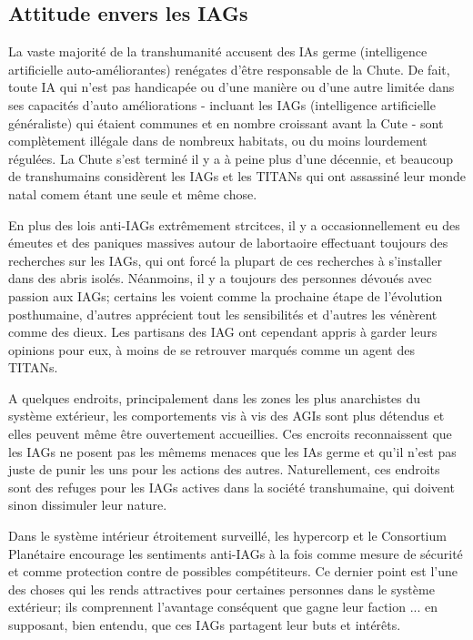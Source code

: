             \subsection{Attitude envers les IAGs} \label{sec:attit-toward-agis} 

            La vaste majorité de la transhumanité accusent des IAs germe (intelligence artificielle auto-améliorantes) renégates d'être responsable de la Chute. De fait, toute IA qui n'est pas handicapée ou d'une manière ou d'une autre limitée dans ses capacités d'auto améliorations - incluant les IAGs (intelligence artificielle généraliste) qui étaient communes et en nombre croissant avant la Cute - sont complètement illégale dans de nombreux habitats, ou du moins lourdement régulées. La Chute s'est terminé il y a à peine plus d'une décennie, et beaucoup de transhumains considèrent les IAGs et les TITANs qui ont assassiné leur monde natal comem étant une seule et même chose. 

            En plus des lois anti-IAGs extrêmement strcitces, il y a occasionnellement eu des émeutes et des paniques massives autour de labortaoire effectuant toujours des recherches sur les IAGs, qui ont forcé la plupart de ces recherches à s'installer dans des abris isolés. Néanmoins, il y a toujours des personnes dévoués avec passion aux IAGs; certains les voient comme la prochaine étape de l'évolution posthumaine, d'autres apprécient tout les sensibilités et d'autres les vénèrent comme des dieux. Les partisans des IAG ont cependant appris à garder leurs opinions pour eux, à moins de se retrouver marqués comme un agent des TITANs. 

            A quelques endroits, principalement dans les zones les plus anarchistes du système extérieur, les comportements vis à vis des AGIs sont plus détendus et elles peuvent même être ouvertement accueillies. Ces encroits reconnaissent que les IAGs ne posent pas les mêmems menaces que les IAs germe et qu'il n'est pas juste de punir les uns pour les actions des autres. Naturellement, ces endroits sont des refuges pour les IAGs actives dans la société transhumaine, qui doivent sinon dissimuler leur nature. 

            Dans le système intérieur étroitement surveillé, les hypercorp et le Consortium Planétaire encourage  les sentiments anti-IAGs à la fois comme mesure de sécurité et comme protection contre de possibles compétiteurs. Ce dernier point est l'une des choses qui les rends attractives pour certaines personnes dans le système extérieur; ils comprennent l'avantage conséquent que gagne leur faction ... en supposant, bien entendu, que ces IAGs partagent leur buts et intérêts. 

